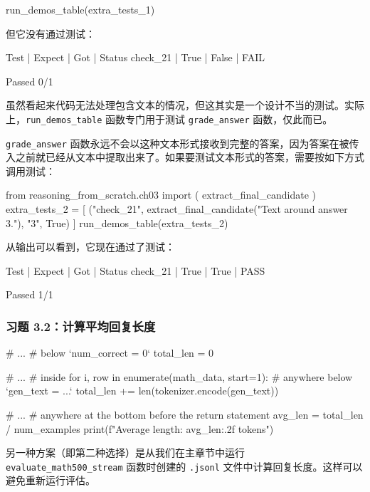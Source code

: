 \begin{codebox}
run_demos_table(extra_tests_1)
\end{codebox}

但它没有通过测试：

\begin{codebox}
Test     | Expect | Got   | Status
check_21 | True   | False | FAIL

Passed 0/1
\end{codebox}

虽然看起来代码无法处理包含文本的情况，但这其实是一个设计不当的测试。实际上，\texttt{run\_demos\_table} 函数专门用于测试 \texttt{grade\_answer} 函数，仅此而已。

\texttt{grade\_answer} 函数永远不会以这种文本形式接收到完整的答案，因为答案在被传入之前就已经从文本中提取出来了。如果要测试文本形式的答案，需要按如下方式调用测试：

\begin{codebox}
from reasoning_from_scratch.ch03 import (
    extract_final_candidate
)
extra_tests_2 = [
    ("check_21",
     extract_final_candidate("Text around answer 3."),
     "3", True)
]
run_demos_table(extra_tests_2)
\end{codebox}

从输出可以看到，它现在通过了测试：

\begin{codebox}
Test     | Expect | Got  | Status
check_21 | True   | True | PASS

Passed 1/1
\end{codebox}

\subsubsection*{习题 3.2：计算平均回复长度}

\begin{codebox}
# ...
# below `num_correct = 0`
total_len = 0

# ...
# inside for i, row in enumerate(math_data, start=1):
# anywhere below `gen_text = ...`
total_len += len(tokenizer.encode(gen_text))

# ...
# anywhere at the bottom before the return statement
avg_len = total_len / num_examples
print(f"Average length: {avg_len:.2f} tokens")
\end{codebox}

另一种方案（即第二种选择）是从我们在主章节中运行 \texttt{evaluate\_math500\_stream} 函数时创建的 \texttt{.jsonl} 文件中计算回复长度。这样可以避免重新运行评估。

